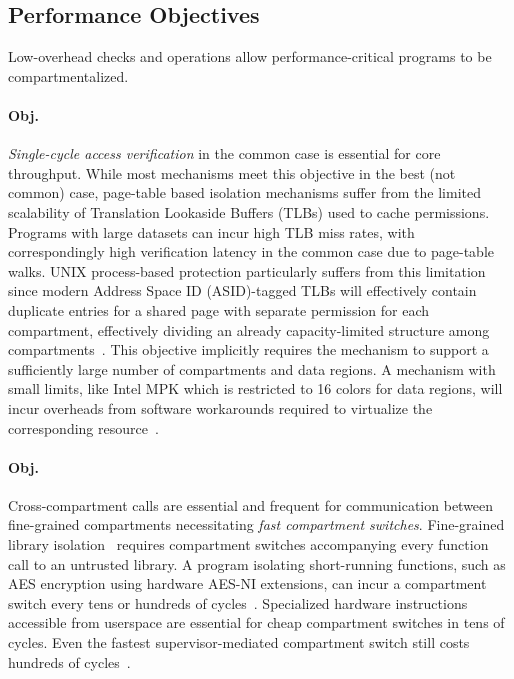 \subsection{Performance Objectives}
\label{sec:reqs:performance}
Low-overhead checks and operations allow performance-critical
programs to be compartmentalized.

\paragraph{Obj. } 
\emph{Single-cycle access verification} in the common case
is essential for core throughput.
While most mechanisms meet this objective in the best (not common) case, 
page-table based isolation mechanisms suffer from the limited scalability
of Translation Lookaside Buffers (TLBs) used to cache permissions.
Programs with large datasets can incur high TLB miss rates, with 
correspondingly high verification latency in the common case due to 
page-table walks.
UNIX process-based protection particularly suffers from this limitation since
modern Address Space ID (ASID)-tagged TLBs will effectively contain duplicate
entries for a shared page with separate permission for each compartment,
effectively dividing an already capacity-limited structure among 
compartments~\cite{HsuHEP16}.
This objective implicitly requires the mechanism to support
a sufficiently large number of compartments and data regions.
A mechanism with small limits, like Intel MPK which is restricted to
16 colors for data regions, will incur overheads from software workarounds
required to virtualize the corresponding resource~\cite{ParkLXMK19}.

\paragraph{Obj. } 
Cross-compartment calls are essential and
frequent for communication between fine-grained compartments
necessitating \emph{fast compartment switches}.
Fine-grained library isolation~\cite{GhosnKPLB21} requires compartment 
switches accompanying every function call to an untrusted library.
A program isolating short-running functions, 
such as AES encryption using hardware AES-NI extensions, 
can incur a compartment switch every tens or hundreds of 
cycles~\cite{AbdAllahAES}.
Specialized hardware instructions accessible from userspace are
essential for cheap compartment switches in tens of cycles.
Even the fastest supervisor-mediated compartment switch still costs
hundreds of cycles~\cite{WatsonWNMACDDGL15}.

